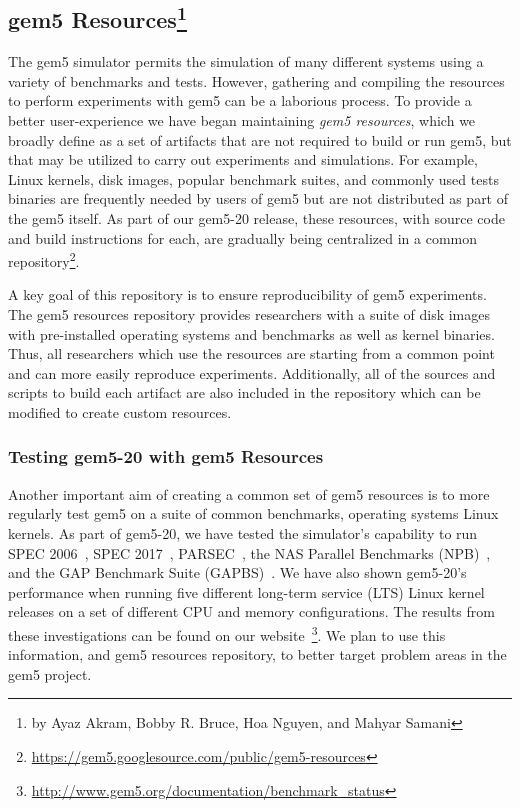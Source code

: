 \subsection[gem5 resources]{gem5 Resources\footnote{by Ayaz Akram, Bobby R. Bruce, Hoa Nguyen, and Mahyar Samani}}
\label{sec:resources}

The gem5 simulator permits the simulation of many different systems
using a variety of benchmarks and tests.
However, gathering and compiling the resources to perform experiments with gem5 can be a laborious process.
To provide a better user-experience we have began maintaining \emph{gem5 resources}, which we broadly define as a set of artifacts that are not required to build or run gem5, but that may be utilized to carry out experiments and simulations.
For example, Linux kernels, disk images, popular benchmark suites, and commonly used tests binaries are frequently needed by users of gem5 but are not distributed as part of the gem5 itself.
As part of our gem5-20 release, these resources, with source code and build instructions for each, are gradually being centralized in a common repository\footnote{\url{https://gem5.googlesource.com/public/gem5-resources}}.

A key goal of this repository is to ensure reproducibility of gem5 experiments.
The gem5 resources repository provides researchers with a suite of disk images with pre-installed operating systems and benchmarks as well as kernel binaries.
Thus, all researchers which use the resources are starting from a common point and can more easily reproduce experiments.
Additionally, all of the sources and scripts to build each artifact are also included in the repository which can be modified to create custom resources.

\subsubsection{Testing gem5-20 with gem5 Resources}

Another important aim of creating a common set of gem5 resources is to more regularly test gem5 on a suite of common benchmarks, operating systems Linux kernels.
As part of gem5-20, we have tested the simulator's capability to run SPEC 2006~\cite{spec06}, SPEC 2017~\cite{spec17}, PARSEC~\cite{parsec}, the NAS Parallel Benchmarks (NPB)~\cite{npb}, and the GAP Benchmark Suite (GAPBS)~\cite{gapbs}.
We have also shown gem5-20's performance when running five different long-term service (LTS) Linux kernel releases on a set of different CPU and memory configurations.
The results from these investigations can be found on our website~\footnote{\url{http://www.gem5.org/documentation/benchmark_status}}.
We plan to use this information, and gem5 resources repository, to better target problem areas in the gem5 project.

